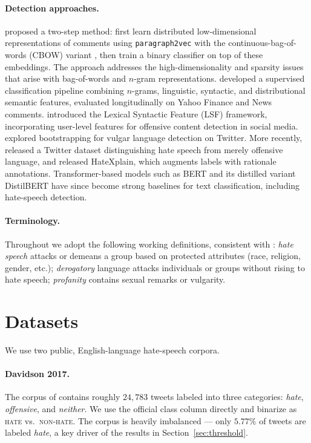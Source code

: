 \documentclass[11pt]{article}
\begin{document}
\paragraph{Detection approaches.}
\citet{djuric2015hate} proposed a two-step method: first learn distributed
low-dimensional representations of comments using \texttt{paragraph2vec} with
the continuous-bag-of-words (CBOW) variant
\citep{le2014distributed,mikolov2013distributed}, then train a binary
classifier on top of these embeddings. The approach addresses the
high-dimensionality and sparsity issues that arise with bag-of-words and
$n$-gram representations.
\citet{nobata2016abusive} developed a supervised classification pipeline
combining $n$-grams, linguistic, syntactic, and distributional semantic
features, evaluated longitudinally on Yahoo Finance and News comments.
\citet{chen2012detecting} introduced the Lexical Syntactic Feature (LSF)
framework, incorporating user-level features for offensive content detection
in social media.
\citet{xiang2012detecting} explored bootstrapping for vulgar language
detection on Twitter. More recently,
\citet{davidson2017automated} released a Twitter dataset distinguishing
hate speech from merely offensive language, and \citet{mathew2021hatexplain}
released HateXplain, which augments labels with rationale annotations.
Transformer-based models such as BERT \citep{devlin2019bert} and its
distilled variant DistilBERT \citep{sanh2019distilbert} have since become
strong baselines for text classification, including hate-speech detection.

\paragraph{Terminology.} Throughout we adopt the following working
definitions, consistent with \citet{nobata2016abusive}:
\textit{hate speech} attacks or demeans a group based on protected
attributes (race, religion, gender, etc.); \textit{derogatory} language
attacks individuals or groups without rising to hate speech;
\textit{profanity} contains sexual remarks or vulgarity.

\section{Datasets}

We use two public, English-language hate-speech corpora.

\paragraph{Davidson 2017.} The corpus of \citet{davidson2017automated}
contains roughly $24{,}783$ tweets labeled into three categories:
\textit{hate}, \textit{offensive}, and \textit{neither}. We use the official
class column directly and binarize as \textsc{hate} vs.\ \textsc{non-hate}.
The corpus is heavily imbalanced --- only $5.77\%$ of tweets are labeled
\textit{hate}, a key driver of the results in
Section~\ref{sec:threshold}.
\end{document}
